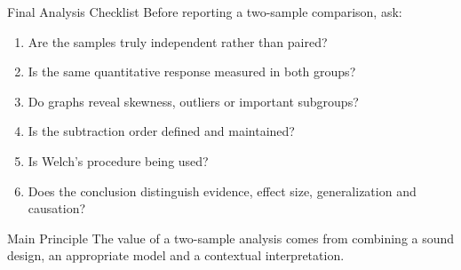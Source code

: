 \documentclass[aspectratio=169,10pt]{beamer}
\begin{document}
\begin{frame}{Final Analysis Checklist}
Before reporting a two-sample comparison, ask:

\begin{enumerate}
  \item Are the samples truly independent rather than paired?
  \item Is the same quantitative response measured in both groups?
  \item Do graphs reveal skewness, outliers or important subgroups?
  \item Is the subtraction order defined and maintained?
  \item Is Welch's procedure being used?
  \item Does the conclusion distinguish evidence, effect size, generalization and causation?
\end{enumerate}

\begin{block}{Main Principle}
The value of a two-sample analysis comes from combining a sound design, an appropriate model and a contextual interpretation.
\end{block}
\end{frame}
\end{document}

